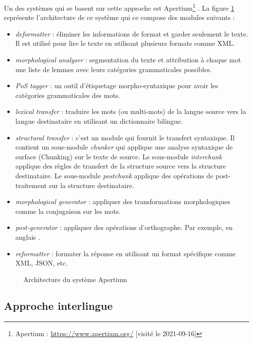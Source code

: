 \documentclass{KodeBook}
\begin{document}
Un des systèmes qui se basent sur cette approche est Apertium\footnote{Apertium : \url{https://www.apertium.org/} [visité le 2021-09-16]} \cite{11-forcada-al}.
La figure \ref{fig:apertium-arch} représente l'architecture de ce système qui ce compose des modules suivants :
\begin{itemize}
	\item \textit{deformatter} : éliminer les informations de format et garder seulement le texte. 
	Il est utilisé pour lire le texte en utilisant plusieurs formats comme XML.
	\item \textit{morphological analyser} : segmentation du texte et attribution à chaque mot une liste de lemmes avec leurs catégories grammaticales possibles.
	\item \textit{PoS tagger} : un outil d'étiquetage morpho-syntaxique pour avoir les catégories grammaticales des mots.
	\item \textit{lexical transfer} : traduire les mots (ou multi-mots) de la langue source vers la langue destinataire en utilisant un dictionnaire bilingue.
	\item \textit{structural transfer} : c'est un module qui fournit le transfert syntaxique. 
	Il contient un sous-module \textit{chunker} qui applique une analyse syntaxique de surface (Chunking) sur le texte de source. 
	Le sous-module \textit{interchunk} applique des règles de transfert de la structure source vers la structure destinataire. 
	Le sous-module \textit{postchunk} applique des opérations de post-traitement sur la structure destinataire.
	\item \textit{morphological generator} : appliquer des transformations morphologiques comme la conjugaison sur les mots. 
	\item \textit{post-generator} : appliquer des opérations d'orthographe. 
	Par exemple, en anglais .
	\item \textit{reformatter} : formater la réponse en utilisant un format spécifique comme XML, JSON, etc.
\end{itemize}

\begin{figure}[!ht]
	\centering
	\caption[Architecture du système Apertium]{Architecture du système Apertium \cite{11-forcada-al}}
	\label{fig:apertium-arch}
\end{figure}

\subsection{Approche interlingue}
\end{document}
